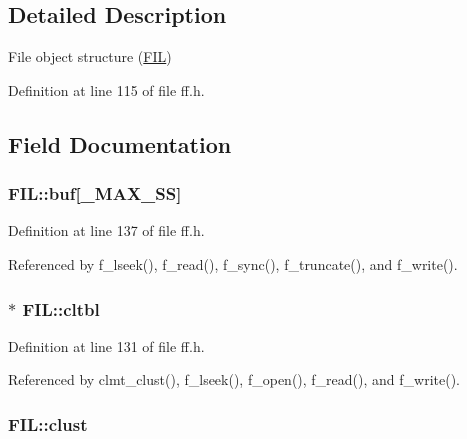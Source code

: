 \subsection{Detailed Description}
File object structure (\hyperlink{structFIL}{F\+IL}) 

Definition at line 115 of file ff.\+h.



\subsection{Field Documentation}
\subsubsection[{\texorpdfstring{buf}{buf}}]{ F\+I\+L\+::buf\mbox{[}{\bf \+\_\+\+M\+A\+X\+\_\+\+SS}\mbox{]}}\hypertarget{structFIL_a7a95fb86588663e48309b5cded7e207b}{}\label{structFIL_a7a95fb86588663e48309b5cded7e207b}


Definition at line 137 of file ff.\+h.



Referenced by f\+\_\+lseek(), f\+\_\+read(), f\+\_\+sync(), f\+\_\+truncate(), and f\+\_\+write().

\subsubsection[{\texorpdfstring{cltbl}{cltbl}}]{$\ast$ F\+I\+L\+::cltbl}\hypertarget{structFIL_a28a30613d48cefcf9efbd334cd861fc8}{}\label{structFIL_a28a30613d48cefcf9efbd334cd861fc8}


Definition at line 131 of file ff.\+h.



Referenced by clmt\+\_\+clust(), f\+\_\+lseek(), f\+\_\+open(), f\+\_\+read(), and f\+\_\+write().

\subsubsection[{\texorpdfstring{clust}{clust}}]{ F\+I\+L\+::clust}\hypertarget{structFIL_aa41312aba551b9a6d1c9d3c8c7d2734b}{}\label{structFIL_aa41312aba551b9a6d1c9d3c8c7d2734b}


